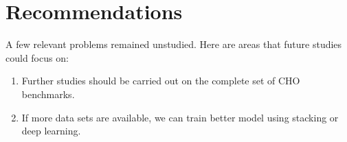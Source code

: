 \chapter{Recommendations}

A few relevant problems remained unstudied. Here are areas that future studies could focus on:

\begin{enumerate}
    \item Further studies should be carried out on the complete set of CHO benchmarks.
    \item If more data sets are available, we can train better model using stacking or deep learning.
\end{enumerate}